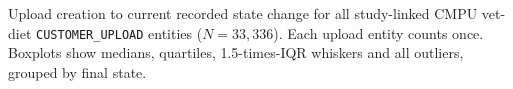 Upload creation to current recorded state change for all
study-linked CMPU vet-diet \texttt{CUSTOMER\_UPLOAD} entities
($N=33{,}336$). Each upload entity counts once. Boxplots show medians,
quartiles, 1.5-times-IQR whiskers and all outliers, grouped by final state.
